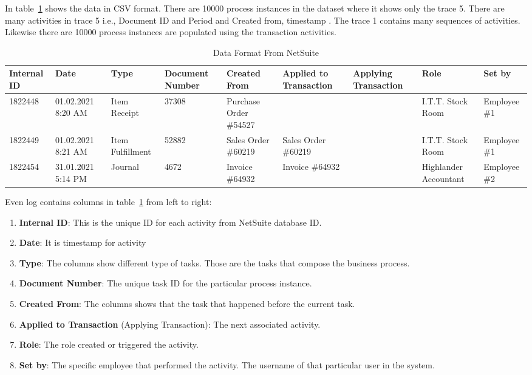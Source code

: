 In table~\ref{table:dataformat} shows the data in CSV format. 
There are 10000 process instances in the dataset where it shows only the trace 5. There are many activities in trace 5 i.e., Document ID and Period and Created from, timestamp . The trace 1 contains many sequences of activities. Likewise there are 10000 process instances are populated using the transaction activities.

\begin{table}[htb]
\scriptsize %
\begin{tabularx}{\textwidth}{|X|X|X|X|X|X|X|X|X|}
\hline
Internal ID & Date & Type & Document Number & Created From & Applied to Transaction & Applying Transaction & Role & Set by\\
\hline
1822448 & 01.02.2021 8:20 AM & Item Receipt & 37308 & Purchase Order \#54527 &  &   & I.T.T. Stock Room & Employee \#1\\
\hline
1822449 & 01.02.2021 8:21 AM & Item Fulfillment & 52882 & Sales Order \#60219 & Sales Order \#60219  &   & I.T.T. Stock Room & Employee \#1\\
\hline
1822454 & 31.01.2021 5:14 PM & Journal & 4672 &	Invoice \#64932 &	Invoice \#64932 &	& Highlander Accountant &	Employee \#2 \\
\hline
\end{tabularx}
\caption{Data Format From NetSuite}
\label{table:dataformat}
\end{table}


Even log contains columns in table~\ref{table:dataformat} from left to right:
\begin{enumerate}
    \item \textbf{Internal ID}: This is the unique ID for each activity from NetSuite database ID.
    \item \textbf{Date}: It is timestamp for activity
    \item \textbf{Type}: The columns show different type of tasks. Those are the tasks that compose the business process.
    \item \textbf{Document Number}: The unique task ID for the particular process instance.
    \item \textbf{Created From}: The columns shows that the task that happened before the current task.
    \item \textbf{Applied to Transaction} (Applying Transaction): The next associated activity.
    \item \textbf{Role}: The role created or triggered the activity.
    \item \textbf{Set by}: The specific employee that performed the activity. The username of that particular user in the system.
\end{enumerate}

